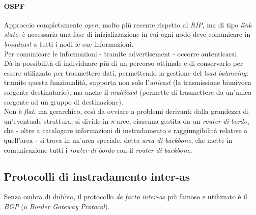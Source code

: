 \paragraph{OSPF}
Approccio completamente \textit{open}, molto più recente rispetto al \textit{RIP}, ma di tipo \textit{link state}: è necessaria una fase di inizializzazione in cui ogni nodo deve comunicare in \textit{broadcast} a tutti i nodi le sue informazioni. \\
Per comunicare le informazioni - tramite advertisement - occorre autenticarsi. \\
Dà la possibilità di individuare più di un percorso ottimale e di conservarlo per essere utilizzato per trasmettere dati, permettendo la gestione del \textit{load balancing}: tramite questa funzionalità, supporta non solo l'\textit{unicast} (la trasmissione biunivoca sorgente-destinatario), ma anche il \textit{multicast} (permette di trasmettere da un'unica sorgente ad un gruppo di destinazione). \\
Non è \textit{flat}, ma gerarchico, così da ovviare a problemi derivanti dalla grandezza di un'eventuale struttura: si divide in \textit{n} aree, ciascuna gestita da un \textit{router di bordo}, che - oltre a catalogare informazioni di instradamento e raggiungibilità relative a quell'area - si trova in un'area speciale, detta \textit{area di backbone}, che mette in comunicazione tutti i \textit{router di bordo} con il \textit{router di backbone}. 

\subsection{Protocolli di instradamento inter-as}
Senza ombra di dubbio, il protocollo \textit{de facto} \textit{inter-as} più famoso e utilizzato è il \textit{BGP} (o \textit{Border Gateway Protocol}).

